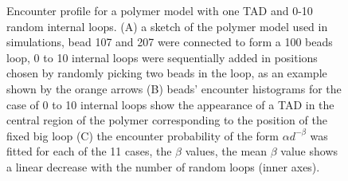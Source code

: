 \documentclass[12pt]{article}
\begin{document}
\begin{figure}[H]
\caption{Encounter profile for a polymer model with one TAD and 0-10 random internal loops. (A) a sketch of the polymer model used in simulations, bead 107 and 207 were connected to form a 100 beads loop, 0 to 10 internal loops were sequentially added in positions chosen by randomly picking two beads in the loop, as an example shown by the orange arrows (B) beads' encounter histograms for the case of 0 to 10 internal loops show the appearance of a TAD in the central region of the polymer corresponding to the position of the fixed big loop (C) the encounter probability of the form $\alpha d^{-\beta}$ was fitted for each of the 11 cases, the $\beta$ values, the mean $\beta$ value shows a linear decrease with the number of random loops (inner axes).}
\label{figure_encounterProfileOneTADWithTails}
\end{figure}
\end{document}
